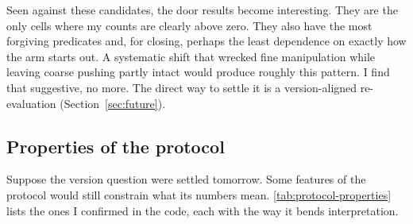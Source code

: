 Seen against these candidates, the door results become interesting. They are the only cells where my counts are clearly above zero. They also have the most forgiving predicates and, for closing, perhaps the least dependence on exactly how the arm starts out. A systematic shift that wrecked fine manipulation while leaving coarse pushing partly intact would produce roughly this pattern. I find that suggestive, no more. The direct way to settle it is a version-aligned re-evaluation (Section~\ref{sec:future}).

\subsection*{Properties of the protocol}
\label{sec:protocol-properties}

Suppose the version question were settled tomorrow. Some features of the protocol would still constrain what its numbers mean. \ref{tab:protocol-properties} lists the ones I confirmed in the code, each with the way it bends interpretation.

